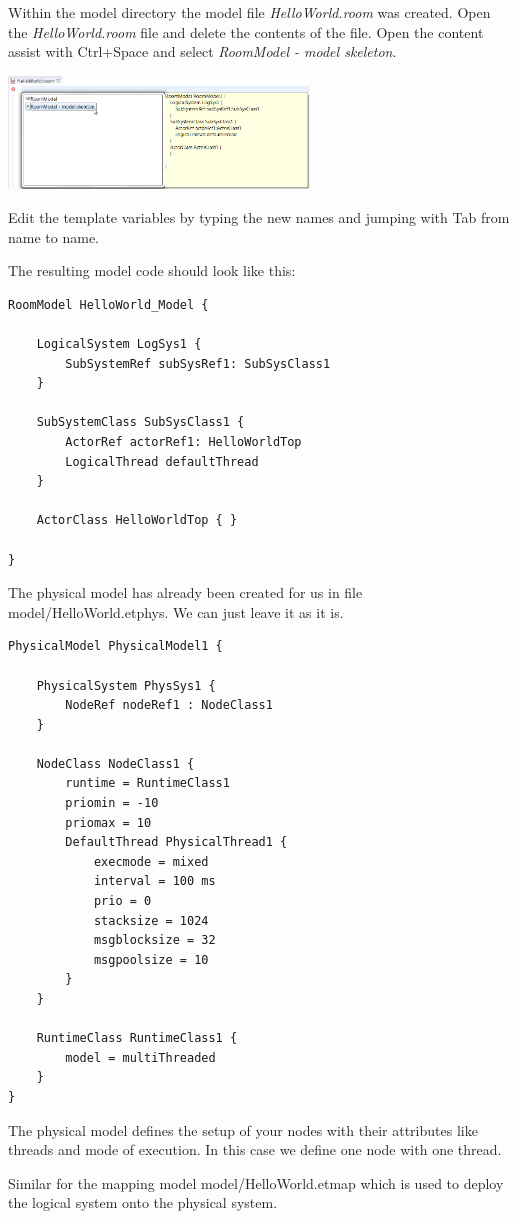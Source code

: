 Within the model directory the model file \emph{HelloWorld.room} was created. Open the 
\emph{HelloWorld.room} file and delete the contents of the file. Open the content assist with Ctrl+Space 
and select \emph{RoomModel - model skeleton}.

\includegraphics[width=0.6\textwidth]{images/015-HelloWorld12.png}

Edit the template variables by typing the new names and jumping with Tab from name to name.

The resulting model code should look like this:

\begin{lstlisting}[language=ROOM]
RoomModel HelloWorld_Model {

	LogicalSystem LogSys1 {
		SubSystemRef subSysRef1: SubSysClass1
	}

	SubSystemClass SubSysClass1 {
		ActorRef actorRef1: HelloWorldTop
		LogicalThread defaultThread
	}

	ActorClass HelloWorldTop { }

}
\end{lstlisting}

The physical model has already been created for us in file model/HelloWorld.etphys.
We can just leave it as it is.

\begin{lstlisting}[language=etPhys]
PhysicalModel PhysicalModel1 {

	PhysicalSystem PhysSys1 {
		NodeRef nodeRef1 : NodeClass1
	}

	NodeClass NodeClass1 {
		runtime = RuntimeClass1
		priomin = -10
		priomax = 10
		DefaultThread PhysicalThread1 {
			execmode = mixed
			interval = 100 ms
			prio = 0
			stacksize = 1024
			msgblocksize = 32
			msgpoolsize = 10
		}
	}

	RuntimeClass RuntimeClass1 {
		model = multiThreaded
	}
}
\end{lstlisting}

The physical model defines the setup of your nodes with their attributes like threads and mode of execution. In this case we define one node with one thread. 

Similar for the mapping model model/HelloWorld.etmap which is used to deploy the logical system onto the physical system.

